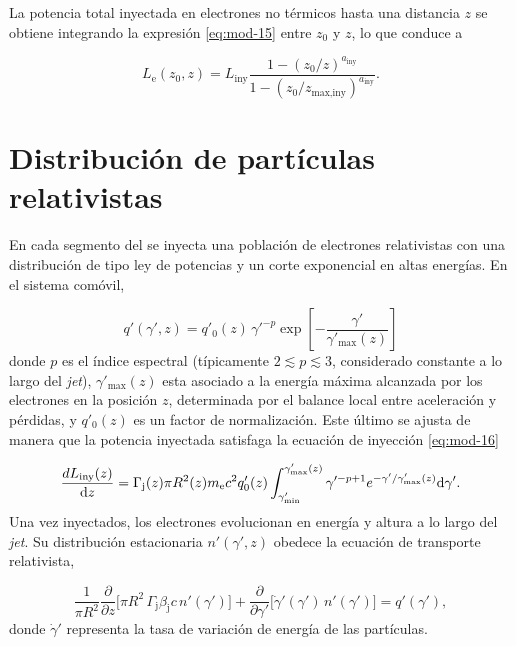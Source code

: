 	La potencia total inyectada en electrones no térmicos hasta una distancia $z$ se obtiene integrando la expresión \eqref{eq:mod-15} entre $z_0$ y $z$, lo que conduce a  

\begin{equation}\label{eq:mod-17}
    L_\text{e}(z_0,z)=L_\text{iny}\frac{1-(z_0/z)^{a_\text{iny}}}
    {1-(z_0/z_\text{max,iny})^{a_\text{iny}}}.
\end{equation}

\section{Distribución de partículas relativistas}

	En cada segmento del \jet se inyecta una población de electrones relativistas con una distribución de tipo ley de potencias y un corte exponencial en altas energías. En el sistema comóvil,

\begin{equation}\label{eq:mod-18}
    q'(\gamma', z) = q'_0(z)\, \gamma'^{-p} \exp\left[-\frac{\gamma'}{\gamma'_{\max}(z)}\right]
\end{equation}
donde $p$ es el índice espectral (típicamente $2 \lesssim p \lesssim 3$, considerado constante a lo largo del \textit{jet}), $\gamma'_{\max}(z)$ esta asociado a la energía máxima alcanzada por los electrones en la posición $z$, determinada por el balance local entre aceleración y pérdidas, y $q'_0(z)$ es un factor de normalización.
	Este último se ajusta de manera que la potencia inyectada satisfaga la ecuación de inyección \eqref{eq:mod-16}

\begin{equation}\label{eq:mod-19}
    \frac{dL_{\text{iny}}(z)}{\mathrm{d}z} 
= \Gamma_\mathrm{j}(z) \pi R^2(z) m_{\rm e} c^2 q'_0(z) 
\int_{\gamma'_{\min}}^{\gamma'_{\max}(z)} 
\gamma'^{-p+1} e^{-\gamma'/\gamma'_{\max}(z)} \mathrm{d}\gamma'.
\end{equation}
	Una vez inyectados, los electrones evolucionan en energía y altura a lo largo del \textit{jet}.
	Su distribución estacionaria $n'(\gamma', z)$ obedece la ecuación de transporte relativista,  


\begin{equation}\label{eq:mod-20}
    \frac{1}{\pi R^2} 
\frac{\partial}{\partial z} \Big[ \pi R^2 \, \Gamma_\mathrm{j} \beta_\mathrm{j} c \, n'(\gamma') \Big]
+ \frac{\partial}{\partial \gamma'} \Big[ \dot{\gamma}'(\gamma') \, n'(\gamma') \Big]
= q'(\gamma'),
\end{equation}
donde $\dot{\gamma}'$ representa la tasa de variación de energía de las partículas.  

